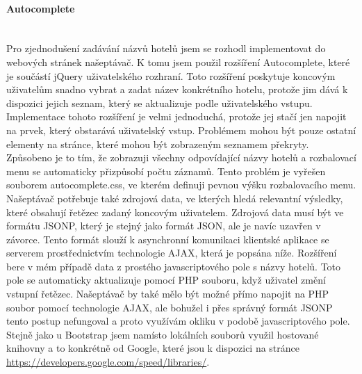\documentclass[czech,BP]{thesiskiv}
\begin{document}
\paragraph{Autocomplete}
\mbox{}\\
Pro zjednodušení zadávání názvů hotelů jsem se rozhodl implementovat do webových stránek našeptávač. K tomu jsem použil rozšíření Autocomplete, které je součástí jQuery uživatelského rozhraní. Toto rozšíření poskytuje koncovým uživatelům snadno vybrat a zadat název konkrétního hotelu, protože jim dává k dispozici jejich seznam, který se aktualizuje podle uživatelského vstupu. Implementace tohoto rozšíření je velmi jednoduchá, protože jej stačí jen napojit na prvek, který obstarává uživatelský vstup. Problémem mohou být pouze ostatní elementy na stránce, které mohou být zobrazeným seznamem překryty. Způsobeno je to tím, že zobrazuji všechny odpovídající názvy hotelů a rozbalovací menu se automaticky přizpůsobí počtu záznamů. Tento problém je vyřešen souborem autocomplete.css, ve kterém definuji pevnou výšku rozbalovacího menu.
\\
Našeptávač potřebuje také zdrojová data, ve kterých hledá relevantní výsledky, které obsahují řetězec zadaný koncovým uživatelem. Zdrojová data musí být ve formátu JSONP, který je stejný jako formát JSON, ale je navíc uzavřen v závorce. Tento formát slouží k asynchronní komunikaci klientské aplikace se serverem prostřednictvím technologie AJAX, která je popsána níže. Rozšíření bere v mém případě data z prostého javascriptového pole s názvy hotelů. Toto pole se automaticky aktualizuje pomocí PHP souboru, když uživatel změní vstupní řetězec. Našeptávač by také mělo být možné přímo napojit na PHP soubor pomocí technologie AJAX, ale bohužel i přes správný formát JSONP tento postup nefungoval a proto využívám okliku v podobě javascriptového pole.
\\
Stejně jako u Bootstrap jsem namísto lokálních souborů využil hostované knihovny a to konkrétně od Google, které jsou k dispozici na stránce\\ \url{https://developers.google.com/speed/libraries/}.
\end{document}

